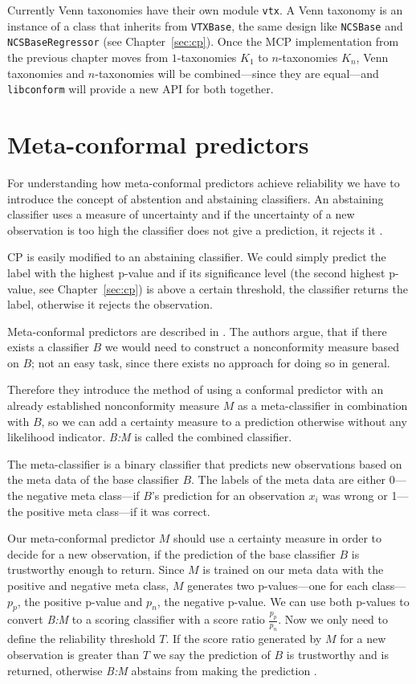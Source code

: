 \documentclass[twoside,11pt]{article}
\def\libconform{\texttt{libconform}}
\begin{document}
Currently Venn taxonomies have their own module
\texttt{vtx}. A Venn taxonomy is an instance of a class
that inherits from \texttt{VTXBase}, the same design
like \texttt{NCSBase} and \texttt{NCSBase\-Re\-gres\-sor}
(see Chapter~\ref{sec:cp}).
Once the MCP implementation from the previous chapter moves
from $1$-taxonomies $K_1$ to $n$-taxonomies $K_n$, Venn
taxonomies and $n$-taxonomies will be combined---since they
are equal---and \libconform{} will provide a new API for
both together.

\section{Meta-conformal predictors}

For understanding how meta-conformal predictors achieve
reliability we have to introduce the concept of abstention
and abstaining classifiers.
An abstaining classifier uses a measure of uncertainty and
if the uncertainty of a new observation is too high the
classifier does not give a prediction, it rejects it
\citep[see][]{vanderlooy_et_al_2009}.

CP is easily modified to an abstaining classifier.
We could simply predict the label with the highest
p-value and if its significance level (the second highest
p-value, see Chapter~\ref{sec:cp}) is above a certain
threshold, the classifier returns the label, otherwise it
rejects the observation.

Meta-conformal predictors are described in
\citet{smirnov_et_al_2009}. The authors argue, that if
there exists a classifier $B$ we would need to construct
a nonconformity measure based on $B$; not an easy task,
since there exists no approach for doing so in general.

Therefore they introduce the method of using a conformal
predictor with an already established nonconformity measure
$M$ as a meta-classifier in combination with $B$, so we can
add a certainty measure to a prediction otherwise without
any likelihood indicator.
\textit{B:M} is called the combined classifier.

The meta-classifier is a binary classifier that predicts
new observations based on the meta data of the base
classifier $B$. The labels of the meta data are either
0---the negative meta class---if $B$'s prediction
for an observation $x_i$ was wrong or 1---the positive
meta class---if it was correct.

Our meta-conformal predictor $M$ should use a certainty
measure in order to decide for a new observation, if the
prediction of the base classifier $B$ is trustworthy enough
to return. Since $M$ is trained on our meta data with the
positive and negative meta class, $M$ generates two
p-values---one for each class---$p_p$, the positive p-value
and $p_n$, the negative p-value.
We can use both p-values to convert \textit{B:M} to a
scoring classifier with a score ratio $\frac{p_p}{p_n}$.
Now we only need to define the reliability threshold $T$.
If the score ratio generated by $M$ for a new observation
is greater than $T$ we say the prediction of $B$ is
trustworthy and is returned, otherwise \textit{B:M}
abstains from making the prediction
\citep[see][]{smirnov_et_al_2009}.
\\
\end{document}
